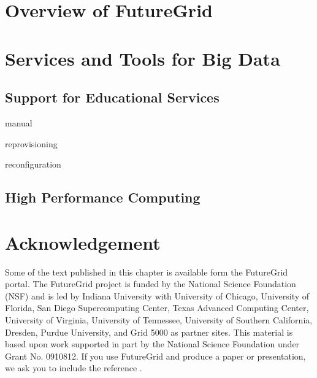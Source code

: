 \documentclass{article}
\begin{document}


\section{Overview of FutureGrid}











\section{Services and Tools for Big Data}

\subsection{Support for Educational Services}

manual

reprovisioning

reconfiguration

\subsection{High Performance Computing}







\section*{Acknowledgement}

Some of the text published in this chapter is available form the
FutureGrid portal. The FutureGrid project is funded by the National
Science Foundation (NSF) and is led by Indiana University with
University of Chicago, University of Florida, San Diego Supercomputing
Center, Texas Advanced Computing Center, University of Virginia,
University of Tennessee, University of Southern California, Dresden,
Purdue University, and Grid 5000 as partner sites. This material is
based upon work supported in part by the National Science Foundation
under Grant No. 0910812. If you use FutureGrid and produce a paper or
presentation, we ask you to include the reference
\cite{las2010gce,las12fg-bookchapter}.



\end{document}
